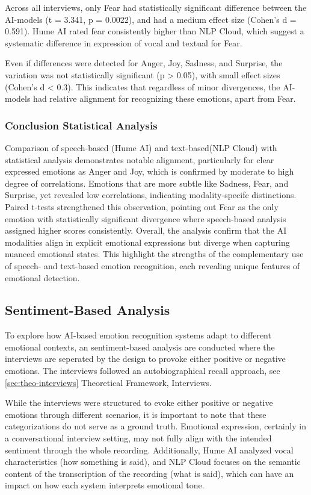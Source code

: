Across all interviews, only Fear had statistically significant difference between the AI-models (t = 3.341, p = 0.0022), and had a medium effect size (Cohen's d = 0.591).
Hume AI rated fear consistently higher than NLP Cloud, which suggest a systematic difference in expression of vocal and textual for Fear. 

Even if differences were detected for Anger, Joy, Sadness, and Surprise, the variation was not statistically significant (p > 0.05), with small effect sizes (Cohen's d < 0.3). 
This indicates that regardless of minor divergences, the AI-models had relative alignment for recognizing these emotions, apart from Fear. 

\subsubsection{Conclusion Statistical Analysis}
Comparison of speech-based (Hume AI) and text-based(NLP Cloud) with statistical analysis demonstrates notable alignment, particularly for clear expressed emotions as Anger and Joy, 
which is confirmed by moderate to high degree of correlations. 
Emotions that are more subtle like Sadness, Fear, and Surprise, yet revealed low correlations, indicating modality-specifc distinctions. Paired t-tests strengthened this observation, pointing out Fear as the only emotion 
with statistically significant divergence where speech-based analysis assigned higher scores consistently. 
Overall, the analysis confirm that the AI modalities align in explicit emotional expressions but diverge when capturing nuanced emotional states. 
This highlight the strengths of the complementary use of speech- and text-based emotion recognition, each revealing unique features of emotional detection. 


\subsection{Sentiment-Based Analysis}
\label{sec:rq2-sentiment}
To explore how AI-based emotion recognition systems adapt to different emotional contexts, an sentiment-based analysis are conducted where the interviews are seperated by the design to provoke either positive or negative emotions.
The interviews followed an autobiographical recall approach, see \ref{sec:theo-interviews} Theoretical Framework, Interviews. 

While the interviews were structured to evoke either positive or negative emotions through different scenarios, it is important to note that these categorizations do not serve as a ground truth. 
Emotional expression, certainly in a conversational interview setting, may not fully align with the intended sentiment through the whole recording. 
Additionally, Hume AI analyzed vocal characteristics (how something is said), and NLP Cloud focuses on the semantic content of the transcription of the recording (what is said), which can have an impact on how each system interprets emotional tone. 


